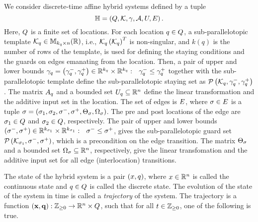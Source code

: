 

We consider discrete-time affine hybrid systems defined by a tuple 
%
\[
\mathbb{H} =
\left(Q,\mathcal{K},\gamma,\mathcal{A},U,E\right).
\]
%
Here, $Q$ is a finite set of locations.  For each location
$q\in Q$, a sub-parallelotopic template
$\mathcal{K}_q\in\mathbb{M}_{k_q\times n}(\mathbb{\mathbb{R}})$, i.e.,
$\mathcal{K}_q\left(\mathcal{K}_q\right)^T$ is non-singular, and $k(q)$
is the number of rows of the template, is used for defining the
staying conditions and the guards on edges emanating from the
location.  Then, a pair of upper and lower bounds
$\gamma_q=\left(\gamma^-_q,\gamma^+_q\right)\in\mathbb{R}^{k_q}\times\mathbb{R}^{k_q}:
~~\gamma^-_q\leq\gamma^+_q$ together with the sub-parallelotopic
template define the sub-parallelotopic staying set as
$\mathcal{P}\left(\mathcal{K}_q,\gamma^-_q,\gamma^+_q\right)$.  The matrix
$A_q$ and a bounded set $U_q\subseteq\mathbb{R}^n$ define the
linear transformation and the additive input set in the location.  The
set of edges is $E$, where $\sigma\in E$ is a tuple $\sigma
= \left(\sigma_{1},\sigma_{2},\sigma^-,\sigma^+,\Theta_\sigma,\Omega_\sigma\right)$.
The pre and post locations of the edge are
$\sigma_{1}\in Q$ and $\sigma_{2}\in Q$,
respectively.  The pair of upper and lower bounds
$\left(\sigma^-,\sigma^+\right)\in\mathbb{R}^{k_{\sigma_{1}}}\times\mathbb{R}^{k_{\sigma_{1}}}:~~\sigma^-\leq\sigma^+$,
gives the sub-parallelotopic guard set
$\mathcal{P}\left(\mathcal{K}_{\sigma_{1}},\sigma^-,\sigma^+\right)$, which
is a precondition on the edge transition.  The matrix $\Theta_\sigma$
and a bounded set $\Omega_\sigma\subseteq\mathbb{R}^n$, respectively,
give the linear transfomation and the additive input set for all edge
(interlocation) transitions.

The state of the hybrid system is a pair $(x,q)$, where
$x\in\mathbb{R}^n$ is called the continuous state and
$q\in Q$ is called the discrete state.  The
evolution of the state of the system in time is called a
\emph{trajectory} of the system.  The trajectory is a function
$\left({\bf x},{\bf q}\right):\mathbb{Z}_{\geq 0}\rightarrow\mathbb{R}^n\times Q$, such
that for all $t\in\mathbb{Z}_{\geq 0}$, one of the following is true.

